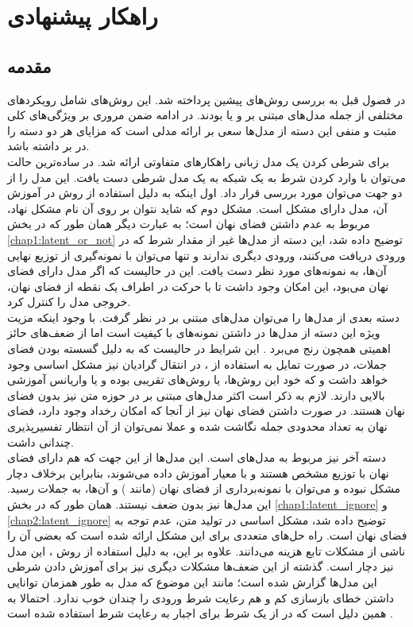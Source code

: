 \chapter{راهکار پیشنهادی}\label{chap3}
\minitoc

\section{مقدمه}
در فصول قبل به بررسی روش‌های پیشین پرداخته شد. این روش‌های شامل رویکرد‌های مختلفی از جمله مدل‌های مبتنی بر \gan{} و یا \vae{} بودند. در ادامه ضمن مروری بر ویژگی‌های کلی مثبت و منفی این دسته از مدل‌ها سعی بر ارائه مدلی است که مزایای هر دو دسته را در بر داشته باشد.
\\
برای شرطی کردن یک مدل زبانی راهکارهای متفاوتی ارائه شد. در ساده‌ترین حالت می‌توان با وارد کردن شرط به یک شبکه  به یک مدل شرطی دست یافت. این مدل را از دو جهت می‌توان مورد بررسی قرار داد. اول اینکه به دلیل استفاده از روش \teacherforcing{} در آموزش آن، مدل دارای مشکل \expbias{} است. مشکل دوم که شاید نتوان بر روی آن نام مشکل نهاد، مربوط به عدم داشتن فضای نهان است؛ به عبارت دیگر همان طور که در بخش  \ref{chap1:latent_or_not} توضیح داده شد، این دسته از مدل‌ها غیر از مقدار شرط که در ورودی دریافت می‌کنند، ورودی دیگری ندارند و تنها می‌توان با نمونه‌گیری از توزیع نهایی آن‌ها، به نمونه‌های مورد نظر دست یافت. این در حالیست که اگر مدل دارای فضای نهان می‌بود، این امکان وجود داشت تا با حرکت در اطراف یک نقطه از فضای نهان، خروجی مدل را کنترل کرد.
\\
دسته بعدی از مدل‌ها را می‌توان مدل‌های مبتنی بر \gan{} در نظر گرفت. با وجود اینکه مزیت ویژه این دسته از مدل‌ها در داشتن  نمونه‌های با کیفیت است اما از ضعف‌های حائز اهمیتی همچون \modecollapse{} رنج می‌برد \cite{wgan}. این شرایط در حالیست که به دلیل گسسته بودن فضای جملات، در صورت تمایل به استفاده از \gan{}، در انتقال گرادیان نیز مشکل اساسی وجود خواهد داشت و که خود این روش‌ها، یا روش‌های تقریبی بوده و یا واریانس آموزشی بالایی دارند. لازم به ذکر است اکثر مدل‌های مبتنی بر \gan{} در حوزه متن نیز بدون فضای نهان هستند. در صورت داشتن فضای نهان نیز از آنجا که امکان رخداد \modecollapse{} وجود دارد، فضای نهان به تعداد محدودی جمله نگاشت شده و عملا نمی‌توان از آن انتظار تفسیرپذیری چندانی داشت.
\\
دسته آخر نیز مربوط به مدل‌های \vae{} است. این مدل‌ها از این جهت که هم دارای فضای نهان با توزیع مشخص هستند و با معیار \likelihood{} آموزش داده می‌شوند، بنابراین برخلاف \gan{} دچار مشکل \modecollapse{} نبوده و می‌توان با نمونه‌برداری از فضای نهان (مانند \gan{}) و \decode{} آن‌ها، به جملات رسید. این مدل‌ها نیز بدون ضعف نیستند. همان طور که در بخش \ref{chap1:latent_ignore} و \ref{chap2:latent_ignore} توضیح داده شد، مشکل اساسی \vae{} در تولید متن، عدم توجه به فضای نهان است. راه حل‌های متعددی برای این مشکل ارائه شده است که بعضی آن را ناشی از مشکلات تابع هزینه می‌دانند. علاوه بر این، به دلیل استفاده از روش ‌\teacherforcing{}، این مدل نیز دچار \expbias{} است. گذشته از این ضعف‌ها مشکلات دیگری نیز برای آموزش دادن شرطی این مدل‌ها گزارش شده است؛ مانند این موضوع که مدل به طور همزمان توانایی داشتن خطای بازسازی کم و هم رعایت شرط ورودی را چندان خوب ندارد. احتمالا به همین دلیل است که در \towardctg{} از یک \classifier{} شرط برای اجبار \decoder{} به رعایت شرط استفاده شده است \cite{toward}.

